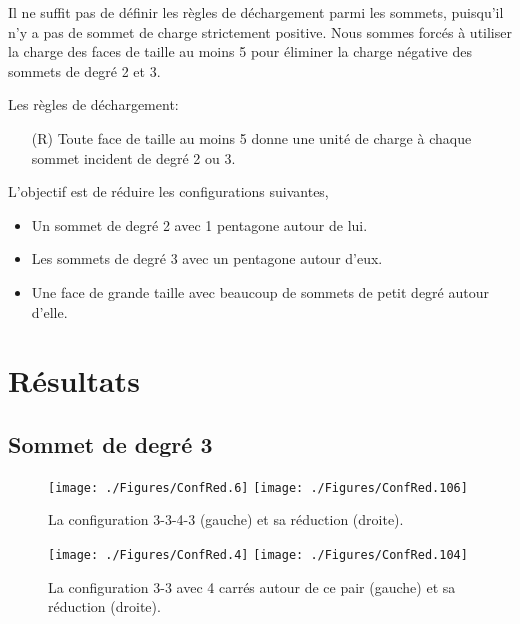 \documentclass{beamer}
\begin{document}
\begin{frame}
Il ne suffit pas de définir les règles de déchargement parmi les sommets, puisqu'il n'y a pas de sommet de charge strictement positive. Nous sommes forcés à utiliser la charge des faces de taille au moins 5 pour éliminer la charge négative des sommets de degré 2 et 3.

Les règles de déchargement:

\begin{enumerate}
\item [(R)] Toute face de taille au moins 5 donne une unité de charge à chaque sommet incident de degré 2 ou 3.
\end{enumerate}
\end{frame}

\begin{frame}

L'objectif est de réduire les configurations suivantes,
\begin{itemize}
\item Un sommet de degré 2 avec 1 pentagone autour de lui.
\item Les sommets de degré 3 avec un pentagone autour d'eux.
\item Une face de grande taille avec beaucoup de sommets de petit degré autour d'elle.
\end{itemize}
\end{frame}

\section{Résultats}
\subsection{Sommet de degré 3}
\begin{frame}
\begin{figure}[ht]
\centerline{
\texttt{[image: ./Figures/ConfRed.6]}
\hfil
\texttt{[image: ./Figures/ConfRed.106]}
}
\caption{La configuration 3-3-4-3 (gauche) et sa réduction (droite).}
\end{figure}
\end{frame}

\begin{frame}
\begin{figure}[ht]
\centerline{
\texttt{[image: ./Figures/ConfRed.4]}
\hfil
\texttt{[image: ./Figures/ConfRed.104]}
}
\caption{La configuration 3-3 avec 4 carrés autour de ce pair (gauche) et sa réduction (droite).}
\end{figure}
\end{frame}
\end{document}
